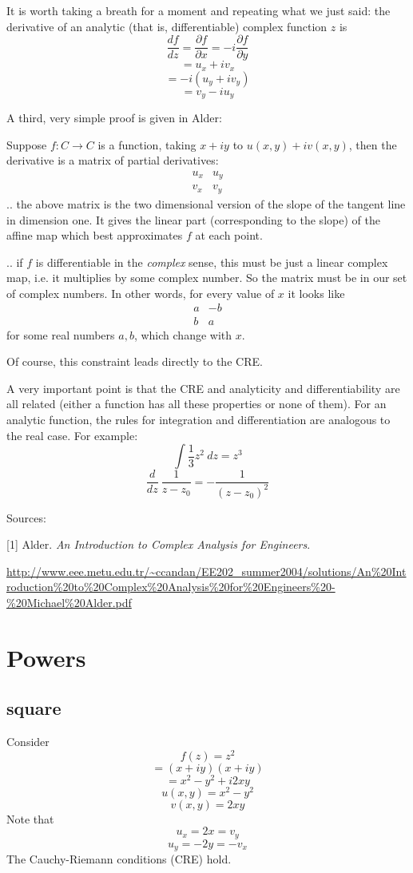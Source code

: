 \documentclass[11pt, oneside]{article}   	%
\begin{document}
It is worth taking a breath for a moment and repeating what we just said:  the derivative of an analytic (that is, differentiable) complex function $z$ is
\[ \frac{df}{dz} = \frac{\partial f}{\partial x} = - i \frac{\partial f}{\partial y} \]
\[ = u_x + i v_x \]
\[ = -i (u_y + i v_y) \]
\[ = v_y - i u_y\] 

A third, very simple proof is given in Alder:

Suppose $f: C \rightarrow C$ is a function, taking $x+iy$ to $u(x,y) + iv(x,y)$, then the derivative is a matrix of partial derivatives:
\[
\begin{matrix}
u_x &  u_y \\
v_x & v_y
\end{matrix}
\]
.. the above matrix is the two dimensional version of the slope of the tangent line in dimension one.  It gives the linear part (corresponding to the slope) of the affine map which best approximates $f$ at each point.

.. if $f$ is differentiable in the \emph{complex} sense, this must be just a linear complex map, i.e. it multiplies by some complex number.  So the matrix must be in our set of complex numbers.  In other words, for every value of $x$ it looks like
\[
\begin{matrix}
a & -b \\
b & a
\end{matrix}
\]
for some real numbers $a,b$, which change with $x$.

Of course, this constraint leads directly to the CRE.

A very important point is that the CRE and analyticity and differentiability are all related  (either a function has all these properties or none of them).  For an analytic function, the rules for integration and differentiation are analogous to the real case.  For example:
\[ \int \frac{1}{3} z^2 \ dz = z^3 \]
\[ \frac{d}{dz} \ \frac{1}{z - z_0} = - \frac{1}{(z-z_0)^2} \]

Sources:

[1] Alder.  \emph{An Introduction to Complex Analysis for Engineers}.

\url{http://www.eee.metu.edu.tr/~ccandan/EE202_summer2004/solutions/An%20Introduction%20to%20Complex%20Analysis%20for%20Engineers%20-%20Michael%20Alder.pdf}

\section{Powers}
\subsection*{square}
Consider 
\[ f(z) = z^2 \]
\[ = (x + iy)(x + iy) \]
\[ = x^2 - y^2 + i2xy \]
\[ u(x,y) = x^2 - y^2 \]
\[ v(x,y) = 2xy \]
Note that
\[ u_x = 2x = v_y \]
\[ u_y = -2y = - v_x \]
The Cauchy-Riemann conditions (CRE) hold.
\end{document}

